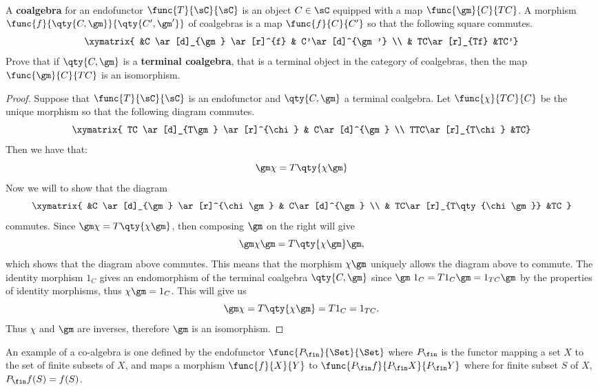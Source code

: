 \documentclass[main.tex]{subfiles}
\begin{document}
\paragraph{}
\begin{exercise}
	A {\bf coalgebra} for an endofunctor $\func{T}{\sC}{\sC}$ is an object $C
	\in \sC$ equipped with a map $\func{\gm}{C}{TC}$. A morphism
	$\func{f}{\qty{C,\gm}}{\qty{C',\gm'}}$ of coalgebras is a map
	$\func{f}{C}{C'}$ so that the following square commutes.
	\[\xymatrix{ &C \ar[d]_{\gm} \ar[r]^{f} & C'\ar[d]^{\gm'}  \\  &
	TC\ar[r]_{Tf} &TC'}\]
	Prove that if $\qty{C,\gm}$ is a {\bf terminal coalgebra}, that is
	a terminal object in the category of coalgebras, then the map
	$\func{\gm}{C}{TC}$ is an isomorphism.
\end{exercise}
\begin{proof}
	Suppose that $\func{T}{\sC}{\sC}$ is an endofunctor and $\qty{C,\gm}$ a
	terminal coalgebra. Let $\func{\chi}{TC}{C}$ be the unique morphism so that
	the following diagram commutes.
	\[\xymatrix{ TC \ar[d]_{T\gm} \ar[r]^{\chi} & C\ar[d]^{\gm} \\
	TTC\ar[r]_{T\chi} &TC}\]
	Then we
	have that: $$ \gm  \chi = T\qty{\chi \gm}    $$ Now we will
	to show that the diagram $$\xymatrix{ &C \ar[d]_{\gm} \ar[r]^{\chi
	\gm} & C\ar[d]^{\gm}  \\  & TC\ar[r]_{T\qty{\chi  \gm}} &TC   } $$
	commutes. Since $ \gm  \chi = T\qty{\chi  \gm}    $, then
	composing $\gm$ on the right will give $$ \gm  \chi  \gm =
	T\qty{\chi  \gm}  \gm,   $$ which shows that the diagram above
	commutes. This means that the morphism $\chi  \gm$ uniquely allows
	the diagram above to commute. The identity morphism $1_C$ gives an
	endomorphism of the terminal coalgebra $\qty{C,\gm}$ since $\gm  \
	1_{C} = T1_{C}  \gm = 1_{TC}  \gm$ by the properties of
	identity morphisms, thus $\chi  \gm = 1_{C}$. This will give us
	$$\gm  \chi = T\qty{\chi  \gm}  = T1_{C} = 1_{TC}.$$ Thus
	$\chi$ and $\gm$ are inverses, therefore $\gm$ is an isomorphism.
\end{proof}

An example of a co-algebra is one defined by the endofunctor
$\func{P_{\fin}}{\Set}{\Set}$ where $P_{\fin}$ is the functor mapping a set $X$ to
the set of finite subsets of $X$, and maps a morphism $\func{f}{X}{Y}$ to
$\func{P_{\fin}f}{P_{\fin}X}{P_{\fin}Y}$ where for finite subset $S$ of $X$,
$P_{\fin}f(S) = f(S)$.
\end{document}
